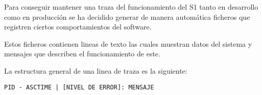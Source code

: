 Para conseguir mantener una traza del funcionamiento del \ac{S1} tanto en desarrollo como en producción se ha decidido generar de manera automática ficheros que registren ciertos comportamientos del software. 

Estos ficheros contienen lineas de texto las cuales muestran datos del sistema y mensajes que describen el funcionamiento de este.

La estructura general de una linea de traza es la siguiente:
\begin{center}
    {\large \texttt{PID - ASCTIME | [NIVEL DE ERROR]: MENSAJE}}
\end{center}


